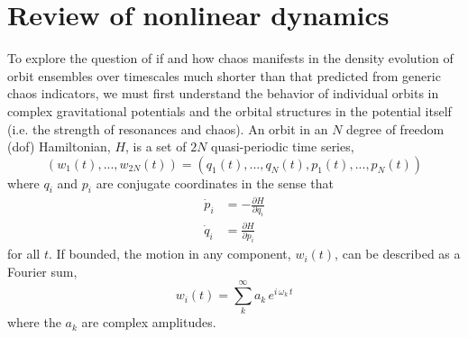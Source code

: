 \documentclass[letterpaper,12pt,preprint]{aastex}
\begin{document}
\section{Review of nonlinear dynamics}\label{sec:nldreview}

To explore the question of if and how chaos manifests in the density evolution of orbit ensembles over timescales much shorter than that predicted from generic chaos indicators, we must first understand the behavior of individual orbits in complex gravitational potentials and the orbital structures in the potential itself (i.e. the strength of resonances and chaos). An orbit in an $N$ degree of freedom (dof) Hamiltonian, $H$, is a set of $2N$ quasi-periodic time series, 
\begin{equation}
(w_1(t),...,w_{2N}(t)) = (q_1(t),...,q_{N}(t),p_1(t),...,p_{N}(t)) \label{eq:coords}
\end{equation}
where $q_i$ and $p_i$ are conjugate coordinates in the sense that
\begin{align}
	\dot{p}_i &= -\frac{\partial H}{\partial q_i}\\
	\dot{q}_i &= \frac{\partial H}{\partial p_i}
\end{align}
for all $t$. If bounded, the motion in any component, $w_i(t)$, can be described as a Fourier sum,
\begin{equation}
	w_i(t) = \sum_k^\infty a_k \, e^{i\,\omega_k\,t} \label{eq:fourier}
\end{equation}
where the $a_k$ are complex amplitudes.
\end{document}
